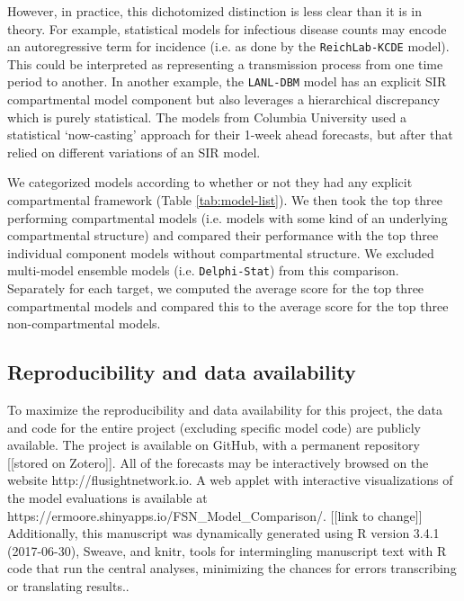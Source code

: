 \documentclass{article}\usepackage[]{graphicx}\usepackage[]{color}
\begin{document}
However, in practice, this dichotomized distinction is less clear than it is in theory.
For example, statistical models for infectious disease counts may encode an autoregressive term for incidence (i.e. as done by the {\tt ReichLab-KCDE} model).
This could be interpreted as representing a transmission process from one time period to another.
In another example, the {\tt LANL-DBM} model has an explicit SIR compartmental model component but also leverages a hierarchical discrepancy which is purely statistical.
The models from Columbia University used a statistical `now-casting' approach for their 1-week ahead forecasts, but after that relied on different variations of an SIR model.

We categorized models according to whether or not they had any explicit compartmental framework (Table \ref{tab:model-list}). 
We then took the top three performing compartmental models (i.e. models with some kind of an underlying compartmental structure) and compared their performance with the top three individual component models without compartmental structure. 
We excluded multi-model ensemble models (i.e. {\tt Delphi-Stat}) from this comparison.
Separately for each target, we computed the average score for the top three compartmental models and compared this to the average score for the top three non-compartmental models.

\subsection{Reproducibility and data availability}

To maximize the reproducibility and data availability for this project, the data and code for the entire project (excluding specific model code) are publicly available.
The project is available on GitHub\cite{fsngithub2018}, with a permanent repository [[stored on Zotero]].
All of the forecasts may be interactively browsed on the website http://flusightnetwork.io.
A web applet with interactive visualizations of the model evaluations is available at https://ermoore.shinyapps.io/FSN\_Model\_Comparison/. [[link to change]]
Additionally, this manuscript was dynamically generated using R version 3.4.1 (2017-06-30), Sweave, and knitr, tools for intermingling manuscript text with R code that run the central analyses, minimizing the chances for errors transcribing or translating results.\cite{Xie2015,RCore2017}.
\end{document}

